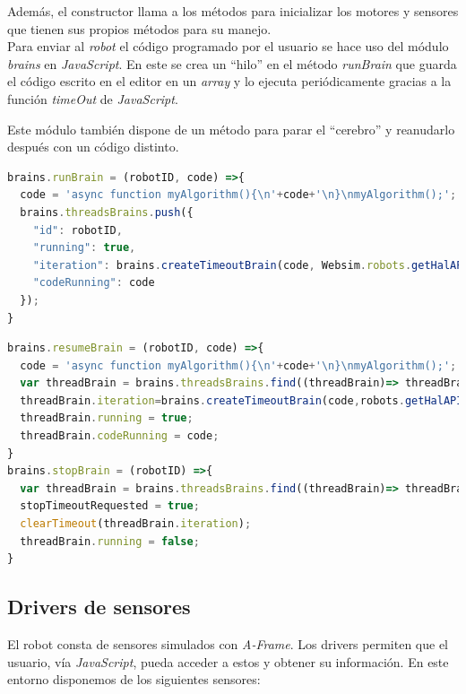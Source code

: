 Además, el constructor llama a los métodos para inicializar los motores y sensores que tienen sus propios métodos para su manejo. \\

Para enviar al \textit{robot} el código programado por el usuario se hace uso del módulo \textit{brains} en \textit{JavaScript}. En este se crea un ``hilo'' en el método \textit{runBrain} que guarda el código escrito en el editor en un \textit{array} y lo ejecuta periódicamente gracias a la función \textit{timeOut} de \textit{JavaScript}.

Este módulo también dispone de un método para parar el ``cerebro'' y reanudarlo después con un código distinto.
\begin{lstlisting}[language=javascript, caption=Método \textit{runBrain} para ejecutar el código del usuario]
brains.runBrain = (robotID, code) =>{
  code = 'async function myAlgorithm(){\n'+code+'\n}\nmyAlgorithm();';
  brains.threadsBrains.push({
    "id": robotID,
    "running": true,
    "iteration": brains.createTimeoutBrain(code, Websim.robots.getHalAPI(robotID), robotID),
    "codeRunning": code
  });
}
\end{lstlisting}

\begin{lstlisting}[language=javascript, caption=Métodos \textit{resumeBrain} y \textit{stopBrain} para parar/reanudar el cerebro del robot]
brains.resumeBrain = (robotID, code) =>{
  code = 'async function myAlgorithm(){\n'+code+'\n}\nmyAlgorithm();';
  var threadBrain = brains.threadsBrains.find((threadBrain)=> threadBrain.id == robotID);
  threadBrain.iteration=brains.createTimeoutBrain(code,robots.getHalAPI(robotID),robotID);
  threadBrain.running = true;
  threadBrain.codeRunning = code;
}
brains.stopBrain = (robotID) =>{
  var threadBrain = brains.threadsBrains.find((threadBrain)=> threadBrain.id == robotID);
  stopTimeoutRequested = true;
  clearTimeout(threadBrain.iteration);
  threadBrain.running = false;
}
\end{lstlisting}


\subsection{Drivers de sensores}
\label{subsec:driversSensores}
El robot consta de sensores simulados con \textit{A-Frame}. Los drivers permiten que el usuario, vía \textit{JavaScript}, pueda acceder a estos y obtener su información. En este entorno disponemos de los siguientes sensores: 

